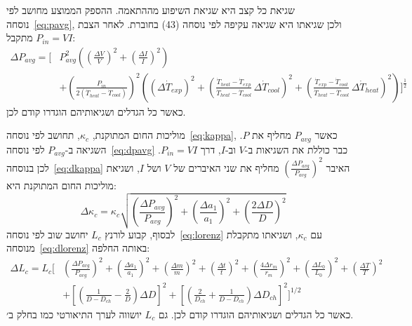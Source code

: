 \documentclass[10pt,a4paper]{article}
\begin{document}
שגיאת כל קצב היא שגיאת השיפוע מההתאמה. ההספק הממוצע מחושב לפי נוסחה~\eqref{eq:pavg}, ולכן שגיאתו היא שגיאה עקיפה לפי נוסחה (43) בחוברת. לאחר הצבת $P_{in} = VI$ מתקבל:
\begin{equation}\label{eq:dpavg}
\begin{split}
\Delta P_{avg} = \Bigg[ & P_{avg}^2\left(\left(\frac{\Delta V}{V}\right)^2 + \left(\frac{\Delta I}{I}\right)^2\right) \\
& + \left(\frac{P_{in}}{2(\dot{T}_{heat} - \dot{T}_{cool})}\right)^2 \left( (\Delta\dot{T}_{exp})^2 + \left(\frac{\dot{T}_{heat} - \dot{T}_{exp}}{\dot{T}_{heat} - \dot{T}_{cool}}\,\Delta\dot{T}_{cool}\right)^2 + \left(\frac{\dot{T}_{exp} - \dot{T}_{cool}}{\dot{T}_{heat} - \dot{T}_{cool}}\,\Delta\dot{T}_{heat}\right)^2 \right) \Bigg]^{\frac{1}{2}}
\end{split}
\end{equation}
כאשר כל הגדלים ושגיאותיהם הוגדרו קודם לכן.

מוליכות החום המתוקנת, $\kappa_c$, תחושב לפי נוסחה~\eqref{eq:kappa}, כאשר $P_{avg}$ מחליף את $P$. השגיאה ב-$P_{avg}$ לפי נוסחה~\eqref{eq:dpavg} כבר כוללת את השגיאות ב-$V$ וב-$I$, דרך $P_{in} = VI$. לכן בנוסחה~\eqref{eq:dkappa} האיבר $\left(\frac{\Delta P_{avg}}{P_{avg}}\right)^2$ מחליף את שני האיברים של $V$ ושל $I$, ושגיאת מוליכות החום המתוקנת היא:
\begin{equation}\label{eq:dkappac}
\Delta\kappa_c = \kappa_c\sqrt{\left(\frac{\Delta P_{avg}}{P_{avg}}\right)^2 + \left(\frac{\Delta a_1}{a_1}\right)^2 + \left(\frac{2\Delta D}{D}\right)^2}
\end{equation}
לבסוף, קבוע לורנץ $L_c$ יחושב שוב לפי נוסחה~\eqref{eq:lorenz} עם $\kappa_c$, ושגיאתו מתקבלת מנוסחה~\eqref{eq:dlorenz} באותה החלפה:
\begin{equation}\label{eq:dlorenzc}
\begin{split}
\Delta L_c = L_c\Bigg[&\left(\frac{\Delta P_{avg}}{P_{avg}}\right)^2 + \left(\frac{\Delta a_1}{a_1}\right)^2 + \left(\frac{\Delta m}{m}\right)^2 + \left(\frac{\Delta t}{t}\right)^2 + \left(\frac{4\Delta r_m}{r_m}\right)^2 + \left(\frac{\Delta L_0}{L_0}\right)^2 + \left(\frac{\Delta T}{T}\right)^2 \\
&+ \left[\left(\frac{1}{D - D_{ch}} - \frac{2}{D}\right)\Delta D\right]^2 + \left[\left(\frac{2}{D_{ch}} + \frac{1}{D - D_{ch}}\right)\Delta D_{ch}\right]^2\Bigg]^{1/2}
\end{split}
\end{equation}
כאשר כל הגדלים ושגיאותיהם הוגדרו קודם לכן. גם $L_c$ יושווה לערך התיאורטי כמו בחלק ב׳.
\end{document}
